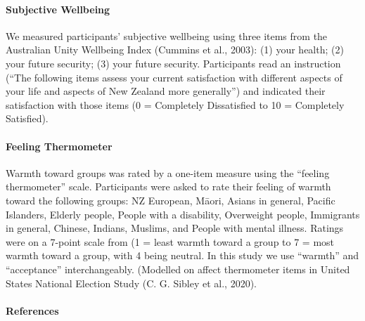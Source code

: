 \documentclass[
  letterpaper,
  DIV=11,
  numbers=noendperiod]{scrartcl}
\let\oldparagraph\paragraph
\renewcommand{\paragraph}[1]{\oldparagraph{#1}\mbox{}}
\begin{document}
\hypertarget{subjective-wellbeing}{%
\paragraph{Subjective Wellbeing}\label{subjective-wellbeing}}

We measured participants' subjective wellbeing using three items from
the Australian Unity Wellbeing Index (Cummins et al., 2003): (1) your
health; (2) your future security; (3) your future security. Participants
read an instruction (``The following items assess your current
satisfaction with different aspects of your life and aspects of New
Zealand more generally'') and indicated their satisfaction with those
items (0 = Completely Dissatisfied to 10 = Completely Satisfied).

\hypertarget{feeling-thermometer}{%
\paragraph{Feeling Thermometer}\label{feeling-thermometer}}

Warmth toward groups was rated by a one-item measure using the ``feeling
thermometer'' scale. Participants were asked to rate their feeling of
warmth toward the following groups: NZ European, Māori, Asians in
general, Pacific Islanders, Elderly people, People with a disability,
Overweight people, Immigrants in general, Chinese, Indians, Muslims, and
People with mental illness. Ratings were on a 7-point scale from (1 =
least warmth toward a group to 7 = most warmth toward a group, with 4
being neutral. In this study we use ``warmth'' and ``acceptance''
interchangeably. (Modelled on affect thermometer items in United States
National Election Study (C. G. Sibley et al., 2020).

\pagebreak

\hypertarget{references}{%
\paragraph{References}\label{references}}
\end{document}
